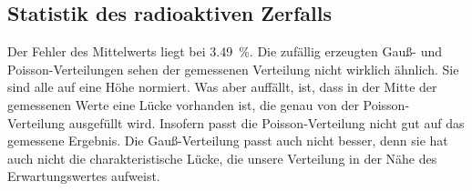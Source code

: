 \subsection{Statistik des radioaktiven Zerfalls}

Der Fehler des Mittelwerts liegt bei \SI{3.49}{\percent}. 
Die zufällig erzeugten Gauß- und Poisson-Verteilungen sehen der gemessenen Verteilung nicht wirklich ähnlich. Sie sind alle auf eine Höhe normiert. Was aber auffällt, ist, dass in der Mitte der gemessenen Werte eine Lücke vorhanden ist, die genau von der Poisson-Verteilung ausgefüllt wird. Insofern passt die Poisson-Verteilung nicht gut auf das gemessene Ergebnis. Die Gauß-Verteilung passt auch nicht besser, denn sie hat auch nicht die charakteristische Lücke, die unsere Verteilung in der Nähe des Erwartungswertes aufweist. 
